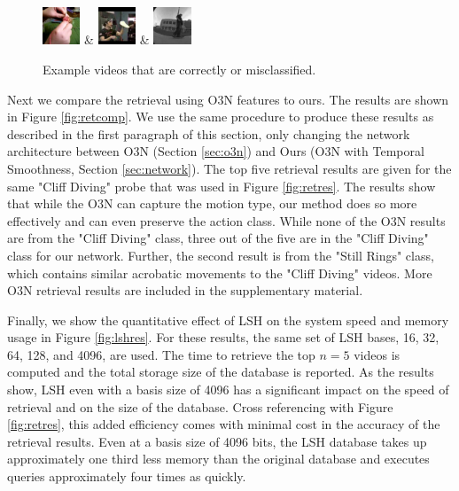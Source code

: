 \begin{figure}[t]
\begin{tabu}
            \includegraphics[width=0.1\textwidth]{images/rep/R_49.png} & 
            \includegraphics[width=0.1\textwidth]{images/rep/R_57.png} &
            \includegraphics[width=0.1\textwidth]{images/rep/R_79.png}\\ \hline            
        \end{tabu}
        \caption{Example videos that are correctly or misclassified.}
        \label{fig:classexamples}
\end{figure}



Next we compare the retrieval using O3N features to ours. The results are shown in Figure \ref{fig:retcomp}. We use the same procedure to produce these results as described in the first paragraph of this section, only changing the network architecture between O3N (Section \ref{sec:o3n}) and Ours (O3N with Temporal Smoothness, Section \ref{sec:network}). The top five retrieval results are given for the same "Cliff Diving" probe that was used in Figure \ref{fig:retres}. The results show that while the O3N can capture the motion type, our method does so more effectively and can even preserve the action class. While none of the O3N results are from the "Cliff Diving" class, three out of the five are in the "Cliff Diving" class for our network. Further, the second result is from the "Still Rings" class, which contains similar acrobatic movements to the "Cliff Diving" videos. More O3N retrieval results are included in the supplementary material.

Finally, we show the quantitative effect of LSH on the system speed and memory usage in Figure \ref{fig:lshres}. For these results, the same set of LSH bases, 16, 32, 64, 128, and 4096, are used. The time to retrieve the top $n=5$ videos is computed and the total storage size of the database is reported. As the results show, LSH even with a basis size of 4096 has a significant impact on the speed of retrieval and on the size of the database. Cross referencing with Figure \ref{fig:retres}, this added efficiency comes with minimal cost in the accuracy of the retrieval results. Even at a basis size of 4096 bits, the LSH database takes up approximately one third less memory than the original database and executes queries approximately four times as quickly.

